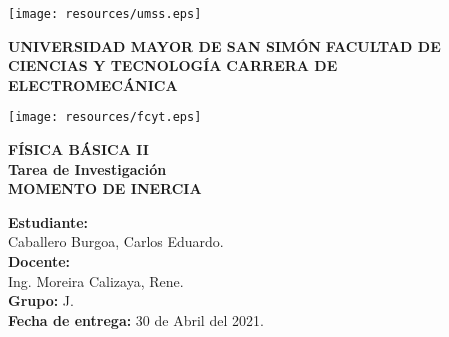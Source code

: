 \documentclass[letter,oneside,11pt]{article}
\begin{document}
\begin{titlepage}
    \begin{center}
        \begin{minipage}[]{.20\linewidth}
            \begin{flushleft}
                \texttt{[image: resources/umss.eps]}
            \end{flushleft}
        \end{minipage}
        \begin{minipage}[]{.55\linewidth}
            \centering
            \large{\textbf{UNIVERSIDAD MAYOR DE SAN SIMÓN}} \newline
            \large{\textbf{FACULTAD DE CIENCIAS Y TECNOLOGÍA}} \newline
            \large{\textbf{CARRERA DE ELECTROMECÁNICA}} \newline
        \end{minipage}
        \begin{minipage}[]{.20\linewidth}
            \begin{flushright}
                \texttt{[image: resources/fcyt.eps]}
            \end{flushright}
        \end{minipage}

        \vspace*{3.0cm}
        {\Large \textbf{FÍSICA BÁSICA II}}\\
        \vspace*{0.3cm}
        {\Large \textbf{Tarea de Investigación}}\\
        \vspace*{3.5cm}
        {\Large \textbf{MOMENTO DE INERCIA}}\\
    \end{center}

    \vspace*{6.5cm}
    \leftskip=7.95cm
    \noindent
    \textbf{Estudiante:}\\
    Caballero Burgoa, Carlos Eduardo.\\
    \newline
    \textbf{Docente:}\\
    Ing. Moreira Calizaya, Rene.\\
    \newline
    \textbf{Grupo:} J.\\
    \textbf{Fecha de entrega:} 30 de Abril del 2021.\\
\end{titlepage}
\end{document}
